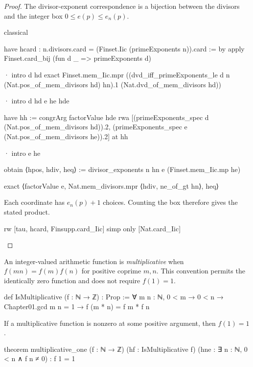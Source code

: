 \begin{proof}
  The divisor-exponent correspondence is a bijection between the divisors and the integer box
  $0\le e(p)\le e_n(p)$.

  \begin{lean}
    classical

    have hcard : n.divisors.card = (Finset.Iic (primeExponents n)).card := by
      apply Finset.card_bij (fun d _ => primeExponents d)

      · intro d hd
        exact Finset.mem_Iic.mpr ((dvd_iff_primeExponents_le d n
          (Nat.pos_of_mem_divisors hd) hn).1 (Nat.dvd_of_mem_divisors hd))

      · intro d hd e he hde

        have hh := congrArg factorValue hde
        rwa [(primeExponents_spec d (Nat.pos_of_mem_divisors hd)).2,
          (primeExponents_spec e (Nat.pos_of_mem_divisors he)).2] at hh

      · intro e he

        obtain ⟨hpos, hdiv, heq⟩ := divisor_exponents n hn e (Finset.mem_Iic.mp he)

        exact ⟨factorValue e, Nat.mem_divisors.mpr ⟨hdiv, ne_of_gt hn⟩, heq⟩
  \end{lean}

  Each coordinate has $e_n(p)+1$ choices.
  Counting the box therefore gives the stated product.

  \begin{lean}
    rw [tau, hcard, Finsupp.card_Iic]
    simp only [Nat.card_Iic]
  \end{lean}
\end{proof}

\begin{definition}
  An integer-valued arithmetic function is \emph{multiplicative} when $f(mn)=f(m)f(n)$ for
  positive coprime $m,n$.
  This convention permits the identically zero function and does not require $f(1)=1$.

  \begin{lean}
    def IsMultiplicative (f : ℕ → ℤ) : Prop :=
      ∀ m n : ℕ, 0 < m → 0 < n → Chapter01.gcd m n = 1 → f (m * n) = f m * f n
  \end{lean}
\end{definition}

\begin{theorem}
  \label{ent:thm:multiplicative-one}
  If a multiplicative function is nonzero at some positive argument, then $f(1)=1$.

  \begin{lean}
    theorem multiplicative_one (f : ℕ → ℤ) (hf : IsMultiplicative f)
        (hne : ∃ n : ℕ, 0 < n ∧ f n ≠ 0) : f 1 = 1
  \end{lean}
\end{theorem}

